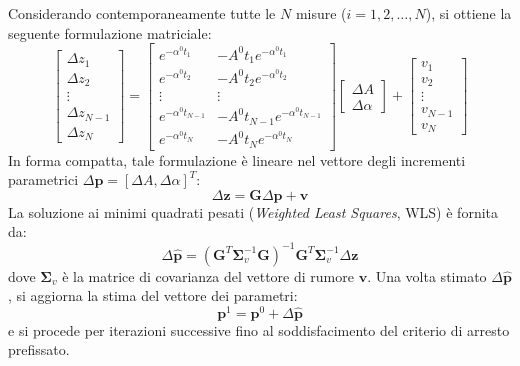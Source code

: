 Considerando contemporaneamente tutte le $N$ misure ($i = 1, 2, \dots, N$), si ottiene la seguente formulazione matriciale:
\begin{equation}
\begin{bmatrix}
\Delta z_{1} \\
\Delta z_{2} \\
\vdots \\
\Delta z_{N-1} \\
\Delta z_{N}
\end{bmatrix}
=
\begin{bmatrix}
e^{-\alpha^{0} t_{1}} & -A^{0} t_{1} e^{-\alpha^{0} t_{1}} \\
e^{-\alpha^{0} t_{2}} & -A^{0} t_{2} e^{-\alpha^{0} t_{2}} \\
\vdots & \vdots \\
e^{-\alpha^{0} t_{N-1}} & -A^{0} t_{N-1} e^{-\alpha^{0} t_{N-1}} \\
e^{-\alpha^{0} t_{N}} & -A^{0} t_{N} e^{-\alpha^{0} t_{N}}
\end{bmatrix}
\begin{bmatrix}
\Delta A \\
\Delta\alpha
\end{bmatrix}
+
\begin{bmatrix}
v_{1} \\
v_{2} \\
\vdots \\
v_{N-1} \\
v_{N}
\end{bmatrix}
\end{equation}
In forma compatta, tale formulazione è lineare nel vettore degli incrementi parametrici $\Delta\mathbf{p} = [\Delta A, \Delta\alpha]^{T}$:
\begin{equation}
\Delta\mathbf{z} = \mathbf{G}\Delta\mathbf{p} + \mathbf{v}
\end{equation}
La soluzione ai minimi quadrati pesati (\textit{Weighted Least Squares}, WLS) è fornita da:
\begin{equation}
\Delta\hat{\mathbf{p}} = (\mathbf{G}^{T}\mathbf{\Sigma}_{v}^{-1}\mathbf{G})^{-1}\mathbf{G}^{T}\mathbf{\Sigma}_{v}^{-1}\Delta\mathbf{z}
\end{equation}
dove $\mathbf{\Sigma}_{v}$ è la matrice di covarianza del vettore di rumore $\mathbf{v}$. Una volta stimato $\Delta\hat{\mathbf{p}}$, si aggiorna la stima del vettore dei parametri:
\begin{equation}
\mathbf{p}^{1} = \mathbf{p}^{0} + \Delta\hat{\mathbf{p}}
\end{equation}
e si procede per iterazioni successive fino al soddisfacimento del criterio di arresto prefissato.

